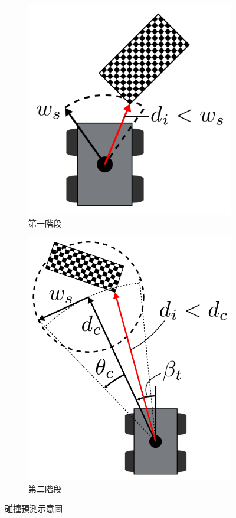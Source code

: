 \begin{figure}[h!]
	\begin{subfigure}[t]{0.48\textwidth}
		\includegraphics[width=\textwidth]{figures/algorithm/collision_1stage}
		\caption{第一階段}
		\label{f:collision_1stage}
	\end{subfigure}
	\begin{subfigure}[t]{0.48\textwidth}
		\includegraphics[width=\textwidth]{figures/algorithm/collision_2stage}
		\caption{第二階段}
		\label{f:collision_2stage}
	\end{subfigure}
	\caption{碰撞預測示意圖}
\end{figure}

